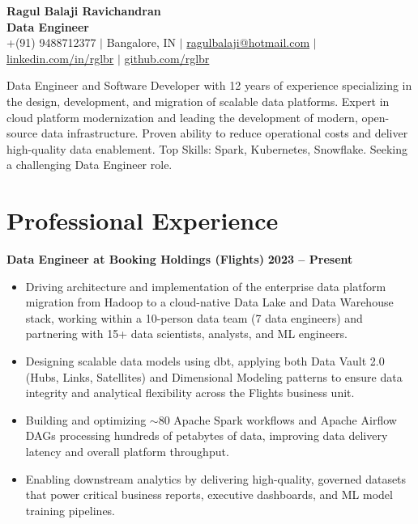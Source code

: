 \documentclass[10pt,a4paper]{article}
\begin{document}
\begin{center}
    {\huge \textbf{\textcolor{primary}{Ragul Balaji Ravichandran}}} \\ \vspace{0.5em}
    \textbf{Data Engineer} \\ \vspace{0.2em}
    +(91) 9488712377 $\vert$ Bangalore, IN $\vert$ \href{mailto:ragulbalaji@hotmail.com}{ragulbalaji@hotmail.com} $\vert$ \href{https://linkedin.com/in/rglbr}{linkedin.com/in/rglbr} $\vert$ \href{https://github.com/rglbr}{github.com/rglbr}
\end{center}

\vspace{0.5em}

\noindent
Data Engineer and Software Developer with 12 years of experience specializing in the design, development, and migration of scalable data platforms. Expert in cloud platform modernization and leading the development of modern, open-source data infrastructure. Proven ability to reduce operational costs and deliver high-quality data enablement. Top Skills: Spark, Kubernetes, Snowflake. Seeking a challenging Data Engineer role.

\section*{Professional Experience}

\noindent
\textbf{Data Engineer at Booking Holdings (Flights)} \hfill \textbf{2023 -- Present}
\begin{itemize}
    \item Driving architecture and implementation of the enterprise data platform migration from Hadoop to a cloud-native Data Lake and Data Warehouse stack, working within a 10-person data team (7 data engineers) and partnering with 15+ data scientists, analysts, and ML engineers.
    \item Designing scalable data models using dbt, applying both Data Vault 2.0 (Hubs, Links, Satellites) and Dimensional Modeling patterns to ensure data integrity and analytical flexibility across the Flights business unit.
    \item Building and optimizing $\sim$80 Apache Spark workflows and Apache Airflow DAGs processing hundreds of petabytes of data, improving data delivery latency and overall platform throughput.
    \item Enabling downstream analytics by delivering high-quality, governed datasets that power critical business reports, executive dashboards, and ML model training pipelines.
\end{itemize}
\end{document}
